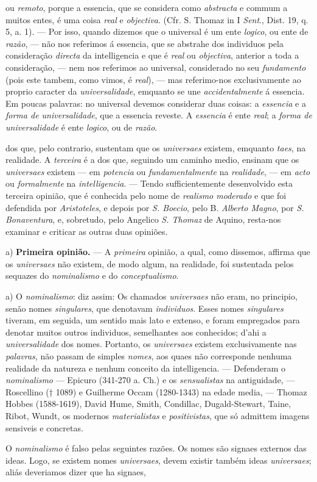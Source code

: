 ou \emph{remoto}, porque a essencia, que se considera como \emph{abstracta} e commum a muitos entes, é uma coisa \emph{real} e \emph{objectiva}. (Cfr. S. Thomaz in I \emph{Sent}., Dist. 19, q. 5, a. 1). --- Por isso, quando dizemos que o universal é um ente \emph{logico}, ou ente de \emph{razão}, --- não nos referimos á essencia, que se abstrahe dos individuos pela consideração \emph{directa} da intelligencia e que é \emph{real} ou \emph{objectiva}, anterior a toda a consideração, --- nem nos referimos ao universal, considerado no seu \emph{fundamento} (pois este tambem, como vimos, é \emph{real}), --- mas referimo-nos exclusivamente ao proprio caracter da \emph{universalidade}, emquanto se une \emph{accidentalmente} á essencia. Em poucas palavras: no universal devemos considerar duas coisas: a \emph{essencia} e a \emph{forma de universalidade}, que a essencia reveste. A \emph{essencia} é ente \emph{real}; a \emph{forma de universalidade} é ente \emph{logico}, ou de \emph{razão}.\par dos que, pelo contrario, sustentam que os \emph{universaes} existem, emquanto \emph{taes}, na realidade. A \emph{terceira} é a dos que, seguindo um caminho medio, ensinam que os \emph{universaes} existem --- em \emph{potencia} ou \emph{fundamentalmente} na \emph{realidade}, --- em \emph{acto} ou \emph{formalmente} na \emph{intelligencia}. --- Tendo sufficientemente desenvolvido esta terceira opinião, que é conhecida pelo nome de \emph{realismo moderado} e que foi defendida por \emph{Aristoteles}, e depois por \emph{S. Boecio}, pelo B. \emph{Alberto Magno}, por \emph{S. Bonaventura}, e, sobretudo, pelo Angelico \emph{S. Thomaz} de Aquino, resta-nos examinar e criticar as outras duas opiniões.\par a) \textbf{Primeira opinião.} --- A \emph{primeira} opinião, a qual, como dissemos, affirma que os \emph{universaes} não existem, de modo algum, na realidade, foi sustentada pelos sequazes do \emph{nominalismo} e do \emph{conceptualismo}.\par a) O \emph{nominalismo}: diz assim: Os chamados \emph{universaes} não eram, no principio, senão nomes \emph{singulares}, que denotavam \emph{individuos}. Esses nomes \emph{singulares} tiveram, em seguida, um sentido mais lato e extenso, e foram empregados para denotar muitos outros individuos, semelhantes aos conhecidos; d'ahi a \emph{universalidade} dos nomes. Portanto, os \emph{universaes} existem exclusivamente nas \emph{palavras}, não passam de simples \emph{nomes}, aos quaes não corresponde nenhuma realidade da natureza e nenhum conceito da intelligencia. --- Defenderam o \emph{nominalismo} --- Epicuro (341-270 a. Ch.) e os \emph{sensualistas} na antiguidade, --- Roscellino († 1089) e Guilherme Occam (1280-1343) na edade media, --- Thomaz Hobbes (1588-1619), David Hume, Smith, Condillac, Dugald-Stewart, Taine, Ribot, Wundt, os modernos \emph{materialistas} e \emph{positivistas}, que só admittem imagens sensiveis e concretas.\par O \emph{nominalismo} é falso pelas seguintes razões. Os nomes são signaes externos das ideas. Logo, se existem nomes \emph{universaes}, devem existir também ideas \emph{universaes}; aliás deveriamos dizer que ha signaes, 
